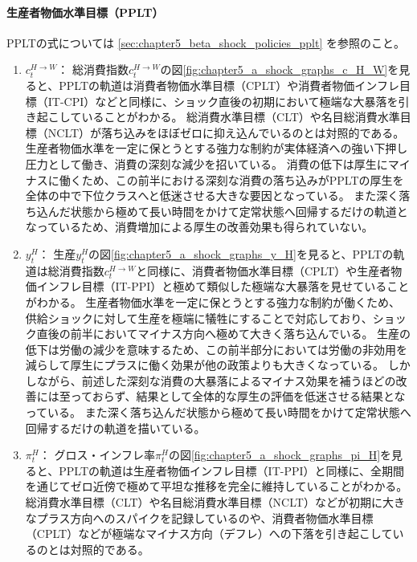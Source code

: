 \paragraph{生産者物価水準目標（PPLT）}
\label{sec:chapter5_a_shock_policies_pplt}
PPLTの式については
\ref{sec:chapter5_beta_shock_policies_pplt}
を参照のこと。
\begin{enumerate}
    \item
    \label{itm:chapter5_a_shock_policies_pplt_c_H_W}
        \(c_t^{H\to W}\)：
        総消費指数\(c_t^{H\to W}\)の図\ref{fig:chapter5_a_shock_graphs_c_H_W}を見ると、PPLTの軌道は消費者物価水準目標（CPLT）や消費者物価インフレ目標（IT-CPI）などと同様に、ショック直後の初期において極端な大暴落を引き起こしていることがわかる。
        総消費水準目標（CLT）や名目総消費水準目標（NCLT）が落ち込みをほぼゼロに抑え込んでいるのとは対照的である。
        生産者物価水準を一定に保とうとする強力な制約が実体経済への強い下押し圧力として働き、消費の深刻な減少を招いている。
        消費の低下は厚生にマイナスに働くため、この前半における深刻な消費の落ち込みがPPLTの厚生を全体の中で下位クラスへと低迷させる大きな要因となっている。
        また深く落ち込んだ状態から極めて長い時間をかけて定常状態へ回帰するだけの軌道となっているため、消費増加による厚生の改善効果も得られていない。
    \item
    \label{itm:chapter5_a_shock_policies_pplt_y_H}
        \(y_t^H\)：
        生産\(y_t^H\)の図\ref{fig:chapter5_a_shock_graphs_y_H}を見ると、PPLTの軌道は総消費指数\(c_t^{H\to W}\)と同様に、消費者物価水準目標（CPLT）や生産者物価インフレ目標（IT-PPI）と極めて類似した極端な大暴落を見せていることがわかる。
        生産者物価水準を一定に保とうとする強力な制約が働くため、供給ショックに対して生産を極端に犠牲にすることで対応しており、ショック直後の前半においてマイナス方向へ極めて大きく落ち込んでいる。
        生産の低下は労働の減少を意味するため、この前半部分においては労働の非効用を減らして厚生にプラスに働く効果が他の政策よりも大きくなっている。
        しかしながら、前述した深刻な消費の大暴落によるマイナス効果を補うほどの改善には至っておらず、結果として全体的な厚生の評価を低迷させる結果となっている。
        また深く落ち込んだ状態から極めて長い時間をかけて定常状態へ回帰するだけの軌道を描いている。
    \item
    \label{itm:chapter5_a_shock_policies_pplt_pi_H}
        \(\pi_t^H\)：
        グロス・インフレ率\(\pi_t^H\)の図\ref{fig:chapter5_a_shock_graphs_pi_H}を見ると、PPLTの軌道は生産者物価インフレ目標（IT-PPI）と同様に、全期間を通じてゼロ近傍で極めて平坦な推移を完全に維持していることがわかる。
        総消費水準目標（CLT）や名目総消費水準目標（NCLT）などが初期に大きなプラス方向へのスパイクを記録しているのや、消費者物価水準目標（CPLT）などが極端なマイナス方向（デフレ）への下落を引き起こしているのとは対照的である。

\end{enumerate}
